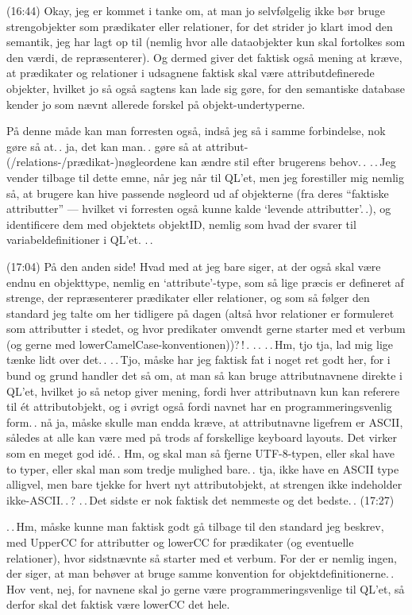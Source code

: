 \documentclass{report}
\begin{document}
(16:44) Okay, jeg er kommet i tanke om, at man jo selvfølgelig ikke bør bruge strengobjekter som prædikater eller relationer, for det strider jo klart imod den semantik, jeg har lagt op til (nemlig hvor alle dataobjekter kun skal fortolkes som den værdi, de repræsenterer). Og dermed giver det faktisk også mening at kræve, at prædikater og relationer i udsagnene faktisk skal være attributdefinerede objekter, hvilket jo så også sagtens kan lade sig gøre, for den semantiske database kender jo som nævnt allerede forskel på objekt-undertyperne. 

På denne måde kan man forresten også, indså jeg så i samme forbindelse, nok gøre så at.\,. ja, det kan man.\,. gøre så at attribut-(/relations-/prædikat-)nøgleordene kan ændre stil efter brugerens behov.\,. .\,.\,Jeg vender tilbage til dette emne, når jeg når til QL'et, men jeg forestiller mig nemlig så, at brugere kan hive passende nøgleord ud af objekterne (fra deres ``faktiske attributter'' --- hvilket vi forresten også kunne kalde `levende attributter'.\,.), og identificere dem med objektets objektID, nemlig som hvad der svarer til variabeldefinitioner i QL'et. .\,. 

(17:04) På den anden side! Hvad med at jeg bare siger, at der også skal være endnu en objekttype, nemlig en `attribute'-type, som så lige præcis er defineret af strenge, der repræsenterer prædikater eller relationer, og som så følger den standard jeg talte om her tidligere på dagen (altså hvor relationer er formuleret som attributter i stedet, og hvor predikater omvendt gerne starter med et verbum (og gerne med lowerCamelCase-konventionen))?\,!\,. .\,. .\,.\,Hm, tjo tja, lad mig lige tænke lidt over det.\,. .\,.\,Tjo, måske har jeg faktisk fat i noget ret godt her, for i bund og grund handler det så om, at man så kan bruge attributnavnene direkte i QL'et, hvilket jo så netop giver mening, fordi hver attributnavn kun kan referere til ét attributobjekt, og i øvrigt også fordi navnet har en programmeringsvenlig form.\,. nå ja, måske skulle man endda kræve, at attributnavne ligefrem er ASCII, således at alle kan være med på trods af forskellige keyboard layouts. Det virker som en meget god idé.\,. Hm, og skal man så fjerne UTF-8-typen, eller skal have to typer, eller skal man som tredje mulighed bare.\,. tja, ikke have en ASCII type alligvel, men bare tjekke for hvert nyt attributobjekt, at strengen ikke indeholder ikke-ASCII.\,.\,? .\,.\,Det sidste er nok faktisk det nemmeste og det bedste.\,. (17:27) 

.\,.\,Hm, måske kunne man faktisk godt gå tilbage til den standard jeg beskrev, med UpperCC for attributter og lowerCC for prædikater (og eventuelle relationer), hvor sidstnævnte så starter med et verbum. For der er nemlig ingen, der siger, at man behøver at bruge samme konvention for objektdefinitionerne.\,. Hov vent, nej, for navnene skal jo gerne være programmeringsvenlige til QL'et, så derfor skal det faktisk være lowerCC det hele. 
\end{document}
